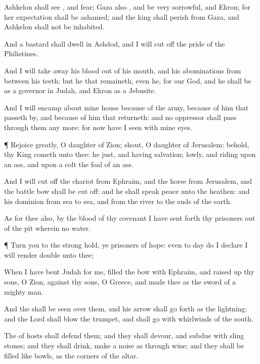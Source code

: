 {Ashkelon shall
see
{}, and
fear;
Gaza also
{}, and be
very
sorrowful, and
Ekron; for her
expectation shall be
ashamed; and the
king shall
perish from
Gaza, and
Ashkelon shall not be
inhabited.

And a
bastard shall
dwell in
Ashdod, and I will cut
off the
pride of the
Philistines.

And I will take
away his
blood out of his
mouth, and his
abominations from between his
teeth: but he that
remaineth, even he,
{} for our
God, and he shall be as a
governor in
Judah, and
Ekron as a
Jebusite.

And I will
encamp about mine
house because of the
army, because of him that passeth
by, and because of him that
returneth: and no
oppressor shall pass
through them any more: for now have I
seen with mine
eyes.


\par }{\PP {}¶
Rejoice
greatly, O
daughter of
Zion;
shout, O
daughter of
Jerusalem: behold, thy
King
cometh unto thee: he
{}
just, and having
salvation;
lowly, and
riding upon an
ass, and upon a
colt the
foal of an
ass.

And I will cut
off the
chariot from
Ephraim, and the
horse from
Jerusalem, and the
battle
bow shall be cut
off: and he shall
speak
peace unto the
heathen: and his
dominion
{} from
sea
{} to
sea, and from the
river
{} to the
ends of the
earth.

As for thee also, by the
blood of thy
covenant I have sent
forth thy
prisoners out of the
pit wherein
{} no
water.


\par }{\PP {}¶
Turn you to the strong
hold, ye
prisoners of
hope: even to
day do I
declare
{} I will
render
double unto thee;

When I have
bent
Judah for me,
filled the
bow with
Ephraim, and raised
up thy
sons, O
Zion, against thy
sons, O
Greece, and
made thee as the
sword of a mighty
man.

And the
{} shall be
seen over them, and his
arrow shall go
forth as the
lightning: and the
Lord
{} shall
blow the
trumpet, and shall
go with
whirlwinds of the
south.

The
{} of
hosts shall
defend them; and they shall
devour, and
subdue with
sling
stones; and they shall
drink,
{} make a
noise as through
wine; and they shall be
filled like
bowls,
{} as the
corners of the
altar.

}
